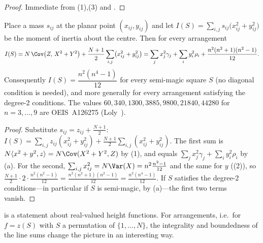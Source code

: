 \begin{proof}
Immediate from (1),(3) and .
\end{proof}

\begin{corollary}
\label{cor:loly}
Place a mass $s_{ij}$ at the planar point $(x_{ij},y_{ij})$ and let
$I(S)=\sum_{i,j}s_{ij}\bigl(x_{ij}^{2}+y_{ij}^{2}\bigr)$ be the moment of inertia about the centre.  Then for every arrangement
\begin{equation}
I(S)=N\,\Cov\bigl(Z,\,X^{2}+Y^{2}\bigr)+\frac{N+1}{2}\sum_{i,j}\bigl(x_{ij}^{2}+y_{ij}^{2}\bigr)
=\sum_j x_j^{2}\gamma_j+\sum_i y_i^{2}\rho_i+\frac{n^{2}(n^{2}+1)(n^{2}-1)}{12}.
\label{eq:loly_identity}
\end{equation}
Consequently $I(S)=\dfrac{n^{2}(n^{4}-1)}{12}$ for every semi-magic square $S$ (no diagonal condition is needed),
and more generally for every arrangement satisfying the degree-$2$ conditions.
The values $60,340,1300,3885,9800,21840,44280$ for $n=3,\dots,9$ are OEIS~A126275 (Loly~\cite{loly2004invariance}).
\end{corollary}

\begin{proof}
Substitute $s_{ij}=z_{ij}+\frac{N+1}2$:
$I(S)=\sum_{i,j}z_{ij}(x_{ij}^{2}+y_{ij}^{2})+\frac{N+1}2\sum_{i,j}(x_{ij}^{2}+y_{ij}^{2})$.
The first sum is $N\langle x^{2}+y^{2},z\rangle=N\Cov(X^{2}+Y^{2},Z)$ by (1), and equals
$\sum_jx_j^{2}\gamma_j+\sum_iy_i^{2}\rho_i$ by (a).  For the second,
$\sum_{i,j}x_{ij}^{2}=N\Var(X)=n^{2}\frac{n^{2}-1}{12}$ and the same for $y$ ((2)), so
$\frac{N+1}2\cdot2\cdot\frac{n^{2}(n^{2}-1)}{12}=\frac{n^{2}(n^{2}+1)(n^{2}-1)}{12}=\frac{n^{2}(n^{4}-1)}{12}$.
If $S$ satisfies the degree-$2$ conditions---in particular if $S$ is semi-magic, by (a)---the
first two terms vanish.
\end{proof}

 is a statement about real-valued height functions.  For arrangements, i.e.\ for
$f=z(S)$ with $S$ a permutation of $\{1,\dots,N\}$, the integrality and boundedness of the line sums
change the picture in an interesting way.

